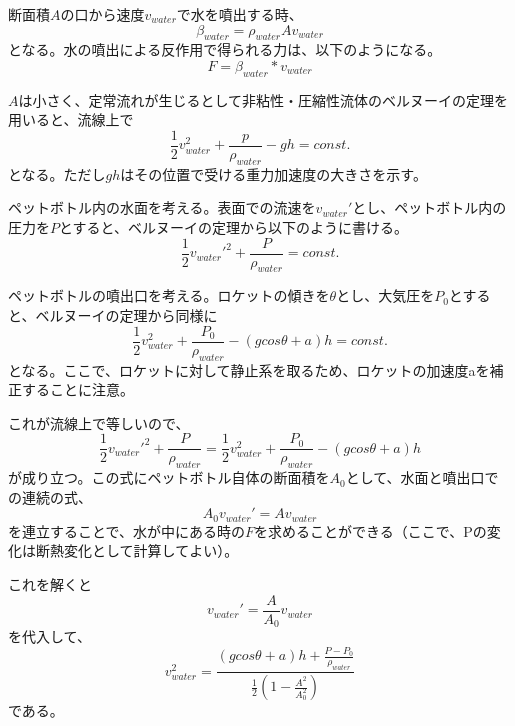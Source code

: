\documentclass{article}
\begin{document}
断面積$A$の口から速度$v_{water}$で水を噴出する時、
\begin{equation}
\beta_{water} = \rho_{water} A v_{water}
\end{equation}
となる。水の噴出による反作用で得られる力は、以下のようになる。
\begin{equation}
F = \beta_{water} * v_{water}
\end{equation}

$A$は小さく、定常流れが生じるとして非粘性・圧縮性流体のベルヌーイの定理を用いると、流線上で
\begin{equation}
\frac{1}{2} v_{water}^2 + \frac{p}{\rho_{water}} - g h = const.
\end{equation}
となる。ただし$g h$はその位置で受ける重力加速度の大きさを示す。

ペットボトル内の水面を考える。表面での流速を$v_{water}'$とし、ペットボトル内の圧力を$P$とすると、ベルヌーイの定理から以下のように書ける。
\begin{equation}
\frac{1}{2} v_{water}'^2 + \frac{P}{\rho_{water}} = const.
\end{equation}

ペットボトルの噴出口を考える。ロケットの傾きを$\theta$とし、大気圧を$P_0$とすると、ベルヌーイの定理から同様に
\begin{equation}
\frac{1}{2} v_{water}^2 + \frac{P_0}{\rho_{water}} - (g cos \theta + a) h  = const.
\end{equation}
となる。ここで、ロケットに対して静止系を取るため、ロケットの加速度aを補正することに注意。

これが流線上で等しいので、
\begin{equation}
\frac{1}{2} v_{water}'^2 + \frac{P}{\rho_{water}} = \frac{1}{2} v_{water}^2 + \frac{P_0}{\rho_{water}} - (g cos \theta + a) h
\end{equation}
が成り立つ。この式にペットボトル自体の断面積を$A_0$として、水面と噴出口での連続の式、
\begin{equation}
A_0 v_{water}' = A v_{water}
\end{equation}
を連立することで、水が中にある時の$F$を求めることができる（ここで、Pの変化は断熱変化として計算してよい）。

これを解くと
\begin{equation}
v_{water}' = \frac{A}{A_0} v_{water}
\end{equation}
を代入して、
\begin{equation}
v_{water}^2 =\frac{ (g cos \theta + a) h + \frac{P -P_0}{\rho_{water}} } {\frac{1}{2}\left( 1 - \frac{A^2}{A_0^2} \right) }
\end{equation}
である。
\end{document}
